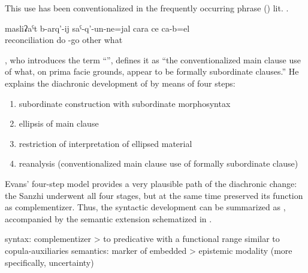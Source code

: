 This use has been conventionalized in the frequently occurring phrase  ()  lit.  .

\begin{exe}
	\ex	\label{ex:He came out to reconcile them or so or there is something else}
	\gll	masliʡaˁt	b-arq'-ij	saˁ-q'-un-ne=jal	cara	ce	ca-b=el\\
		reconciliation	do	-go	other	what	\\
	\glt	{}
\end{exe}

\citet[367]{Evans2007}, who introduces the term ``'', defines it as ``the conventionalized main clause use of what, on prima facie grounds, appear to be formally subordinate clauses.'' He explains the diachronic development of  by means of four steps:
\begin{enumerate}
\item subordinate construction with subordinate morphosyntax
\item ellipsis of main clause
\item restriction of interpretation of ellipsed material
\item reanalysis (conventionalized main clause use of formally subordinate clause)
\end{enumerate}
Evans' four-step model provides a very plausible path of the diachronic change: the Sanzhi  underwent all four stages, but at the same time preserved its function as complementizer. Thus, the syntactic development can be summarized as , accompanied by the semantic extension schematized in .

\begin{exe}
	\ex	 \label{ex:complementizer}
		syntax: complementizer > to predicative  with a functional range similar to copula-auxiliaries 
	\ex	 \label{ex:complementizer2}
	semantics: marker of embedded  > epistemic modality (more specifically, uncertainty)
\end{exe}\largerpage

